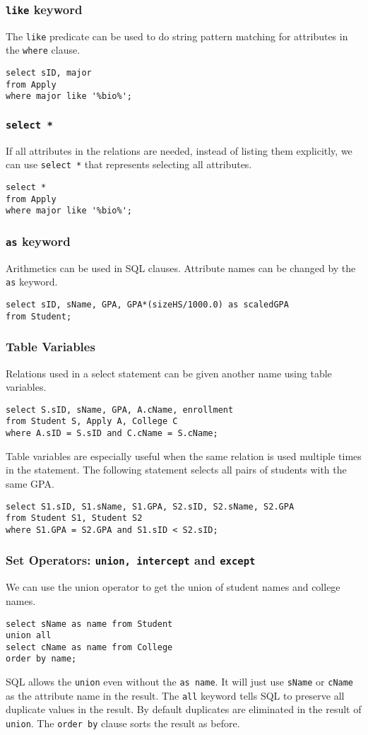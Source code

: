 \subsubsection{\texttt{like} keyword}
The \texttt{like} predicate can be used to do string pattern matching for attributes in the \texttt{where} clause.
\begin{lstlisting}
select sID, major 
from Apply
where major like '%bio%';
\end{lstlisting} 
\subsubsection{\texttt{select *}}
If all attributes in the relations are needed, instead of listing them explicitly, we can use \texttt{select *} that represents selecting all attributes.
\begin{lstlisting}
select * 
from Apply
where major like '%bio%';
\end{lstlisting} 
\subsubsection{\texttt{as} keyword}Arithmetics can be used in SQL clauses. Attribute names can be changed by the \texttt{as} keyword.
\begin{lstlisting}
select sID, sName, GPA, GPA*(sizeHS/1000.0) as scaledGPA
from Student;
\end{lstlisting}
\subsubsection{Table Variables}
Relations used in a select statement can be given another name using table variables. 
\begin{lstlisting}
select S.sID, sName, GPA, A.cName, enrollment
from Student S, Apply A, College C
where A.sID = S.sID and C.cName = S.cName;
\end{lstlisting}
Table variables are especially useful when the same relation is used multiple times in the statement. The following statement selects all pairs of students with the same GPA. 
\begin{lstlisting}
select S1.sID, S1.sName, S1.GPA, S2.sID, S2.sName, S2.GPA
from Student S1, Student S2
where S1.GPA = S2.GPA and S1.sID < S2.sID;
\end{lstlisting}
\subsubsection{Set Operators: \texttt{union, intercept} and \texttt{except}}
We can use the union operator to get the union of student names and college names.
\begin{lstlisting}
select sName as name from Student
union all
select cName as name from College
order by name;
\end{lstlisting}
SQL allows the \texttt{union} even without the \texttt{as name}. It will just use \texttt{sName} or \texttt{cName} as the attribute name in the result. The \texttt{all} keyword tells SQL to preserve all duplicate values in the result. By default duplicates are eliminated in the result of \texttt{union}. The \texttt{order by} clause sorts the result as before.

